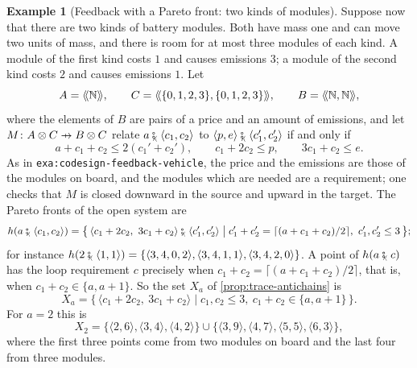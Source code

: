\documentclass[11pt,a4paper]{article}
\theoremstyle{plain}
\theoremstyle{definition}
\newtheorem{example}[theorem]{Example}
\theoremstyle{remark}
\providecommand{\llangle}{\mathopen{\langle\mkern-3.5mu\langle}}
\providecommand{\rrangle}{\mathclose{\rangle\mkern-3.5mu\rangle}}
\newcommand{\tL}[1]{\llangle #1 \rrangle}
\newcommand{\tc}{\mathbin{\fatsemi_{\!\scriptscriptstyle\langle}}}
\newcommand{\tup}[1]{\langle #1 \rangle}
\newcommand{\profto}{\mathrel{\ooalign{\hfil$\mapstochar\mkern 5mu$\hfil\cr$\to$\cr}}}
\newcommand{\N}{\mathbb{N}}
\newcommand{\lbl}[1]{\nolinkurl{#1}}
\begin{document}
\begin{example}[Feedback with a Pareto front: two kinds of modules]
    \label{exa:two-modules}
    Suppose now that there are two kinds of battery modules.
    Both have mass one and can move two units of mass, and there is room for at most three modules of each kind.
    A module of the first kind costs $1$ and causes emissions $3$; a module of the second kind costs $2$ and causes emissions $1$.
    Let
    \begin{equation*}
        A = \tL{\N},
        \qquad
        C = \tL{\{0,1,2,3\}, \{0,1,2,3\}},
        \qquad
        B = \tL{\N, \N},
    \end{equation*}
    where the elements of $B$ are pairs of a price and an amount of emissions, and let $M \colon A \otimes C \profto B \otimes C$ relate $a \tc \tup{c_1, c_2}$ to $\tup{p, e} \tc \tup{c_1', c_2'}$ if and only if
    \begin{equation*}
        a + c_1 + c_2 \leq 2(c_1' + c_2'),
        \qquad
        c_1 + 2c_2 \leq p,
        \qquad
        3c_1 + c_2 \leq e.
    \end{equation*}
    As in \lbl{exa:codesign-feedback-vehicle}, the price and the emissions are those of the modules on board, and the modules which are needed are a requirement; one checks that $M$ is closed downward in the source and upward in the target.
    The Pareto fronts of the open system are
    \begin{equation*}
        h(a \tc \tup{c_1, c_2}) = \bigl\{\, \tup{c_1 + 2c_2,\ 3c_1 + c_2} \tc \tup{c_1', c_2'} \bigm| c_1' + c_2' = \lceil (a + c_1 + c_2)/2 \rceil,\ c_1', c_2' \leq 3 \,\bigr\};
    \end{equation*}
    for instance $h(2 \tc \tup{1,1}) = \{ \tup{3,4,0,2}, \tup{3,4,1,1}, \tup{3,4,2,0} \}$.
    A point of $h(a \tc c)$ has the loop requirement $c$ precisely when $c_1 + c_2 = \lceil (a + c_1 + c_2)/2 \rceil$, that is, when $c_1 + c_2 \in \{a, a+1\}$.
    So the set $X_a$ of \cref{prop:trace-antichains} is
    \begin{equation*}
        X_a = \{\, \tup{c_1 + 2c_2,\ 3c_1 + c_2} \mid c_1, c_2 \leq 3,\ c_1 + c_2 \in \{a, a+1\} \,\}.
    \end{equation*}
    For $a = 2$ this is
    \begin{equation*}
        X_2 = \{ \tup{2,6}, \tup{3,4}, \tup{4,2} \} \cup \{ \tup{3,9}, \tup{4,7}, \tup{5,5}, \tup{6,3} \},
    \end{equation*}
    where the first three points come from two modules on board and the last four from three modules.

\end{example}
\end{document}
